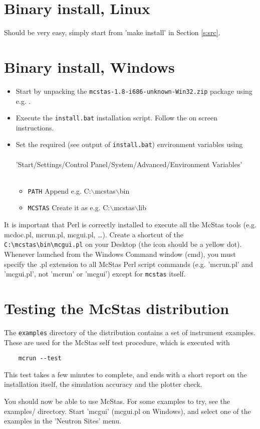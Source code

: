 \section{Binary install, Linux}
\label{s:linbin}
Should be very easy, simply start from 'make install' in Section \ref{s:src}.

\section{Binary install, Windows}
\label{s:winbin}
\begin{itemize}
\item{Start by unpacking the \texttt{mcstas-1.8-i686-unknown-Win32.zip} package using
e.g. .}
\item{Execute the \texttt{install.bat} installation script. Follow the
  on screen instructions.}
\item{Set the required (see output of \texttt{install.bat}) environment variables using
\\\ \\
\noindent 'Start/Settings/Control Panel/System/Advanced/Environment
Variables'\\\ 
  \begin{itemize}
    \item{\verb+PATH+ Append e.g. C:$\backslash$mcstas$\backslash$bin}
    \item{\verb+MCSTAS+ Create it as e.g. C:$\backslash$mcstas$\backslash$lib}
  \end{itemize}}
\end{itemize}
It is important that Perl is correctly installed to execute all the McStas tools (e.g. mcdoc.pl, mcrun.pl, mcgui.pl, \ldots). Create a shortcut of the \verb+C:\mcstas\bin\mcgui.pl+ on your Desktop (the icon should be a yellow dot). Whenever launched from the Windows Command window (cmd), you must specify the .pl extension to all McStas Perl script commands (e.g. 'mcrun.pl' and 'mcgui.pl', not 'mcrun' or 'mcgui') except for \verb+mcstas+ itself.

\section{Testing the McStas distribution}
\label{s:testing}

The \verb+examples+ directory of the distribution contains a set of instrument examples. These are used for the McStas self test procedure, which is executed with
\begin{verbatim}
    mcrun --test
\end{verbatim}
This test takes a few minutes to complete, and ends with a short report on the installation itself, the simulation accuracy and the plotter check. 

You should now be able to use McStas. For some examples to try, see the
examples/ directory. Start 'mcgui' (mcgui.pl on Windows), and select one of the examples in the 'Neutron Sites' menu.
